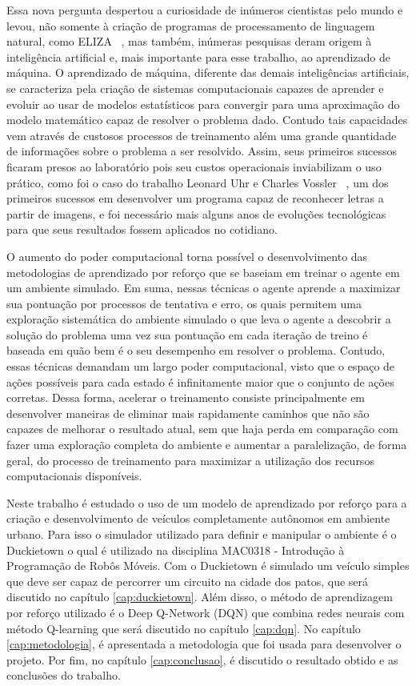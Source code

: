 Essa nova pergunta despertou a curiosidade de inúmeros cientistas pelo mundo e levou, não somente à criação de programas de processamento de linguagem natural, como ELIZA ~\citep{weizenbaum1966eliza}, mas também, inúmeras pesquisas deram origem à inteligência artificial e, mais importante para esse trabalho, ao aprendizado de máquina. O aprendizado de máquina, diferente das demais inteligências artificiais, se caracteriza pela criação de sistemas computacionais capazes de aprender e evoluir ao usar de modelos estatísticos para convergir para uma aproximação do modelo matemático capaz de resolver o problema dado. Contudo tais capacidades vem através de custosos processos de treinamento além uma grande quantidade de informações sobre o problema a ser resolvido. Assim, seus primeiros sucessos ficaram presos ao laboratório pois seu custos operacionais inviabilizam o uso prático, como foi o caso do trabalho Leonard Uhr e Charles Vossler ~\citep{Uhr_Vossler_1961}, um dos primeiros sucessos em desenvolver um programa capaz de reconhecer letras a partir de imagens, e foi necessário mais alguns anos de evoluções tecnológicas para que seus resultados fossem aplicados no cotidiano.

O aumento do poder computacional torna possível o desenvolvimento das metodologias de aprendizado por reforço que se baseiam em treinar o agente em um ambiente simulado. Em suma, nessas técnicas o agente aprende a maximizar sua pontuação por processos de tentativa e erro, os quais permitem uma exploração sistemática do ambiente simulado o que leva o agente a descobrir a solução do problema uma vez sua pontuação em cada iteração de treino é baseada em quão bem é o seu desempenho em resolver o problema. Contudo, essas técnicas demandam um largo poder computacional, visto que o espaço de ações possíveis para cada estado é infinitamente maior que o conjunto de ações corretas. Dessa forma, acelerar o treinamento consiste principalmente em desenvolver maneiras de eliminar mais rapidamente caminhos que não são capazes de melhorar o resultado atual, sem que haja perda em comparação com fazer uma exploração completa do ambiente e aumentar a paralelização, de forma geral, do processo de treinamento para maximizar a utilização dos recursos computacionais disponíveis.

Neste trabalho é estudado o uso de um modelo de aprendizado por reforço para a criação e desenvolvimento de veículos completamente autônomos em ambiente urbano. Para isso o simulador utilizado para definir e manipular o ambiente é o Duckietown o qual é utilizado na disciplina MAC0318 - Introdução à Programação de Robôs Móveis. Com o Duckietown é simulado um veículo simples que deve ser capaz de percorrer um circuito na cidade dos patos, que será discutido no capítulo \ref{cap:duckietown}. Além disso, o método de aprendizagem por reforço utilizado é o Deep Q-Network (DQN) que combina redes neurais com método Q-learning que será discutido no capítulo \ref{cap:dqn}. No capítulo \ref{cap:metodologia}, é apresentada a metodologia que foi usada para desenvolver o projeto. Por fim, no capítulo \ref{cap:conclusao}, é discutido o resultado obtido e as conclusões do trabalho.